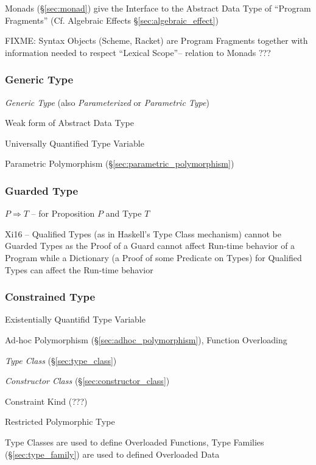 Monads (\S\ref{sec:monad}) give the Interface to the Abstract Data
Type of ``Program Fragments'' (\fist Cf. Algebraic Effects
\S\ref{sec:algebraic_effect})

FIXME: Syntax Objects (Scheme, Racket) are Program Fragments together
with information needed to respect ``Lexical Scope''-- relation to
Monads ???



\subsubsection{Generic Type}\label{sec:generic_type}

\emph{Generic Type} (also \emph{Parameterized} or \emph{Parametric Type})

Weak form of Abstract Data Type

Universally Quantified Type Variable

Parametric Polymorphism (\S\ref{sec:parametric_polymorphism})



\subsubsection{Guarded Type}\label{sec:guarded_type}

$P \Rightarrow T$ -- for Proposition $P$ and Type $T$

Xi16 -- Qualified Types (as in Haskell's Type Class mechanism) cannot
be Guarded Types as the Proof of a Guard cannot affect Run-time
behavior of a Program while a Dictionary (a Proof of some Predicate on
Types) for Qualified Types can affect the Run-time behavior



\subsubsection{Constrained Type}\label{sec:constrained_type}

Existentially Quantifid Type Variable

Ad-hoc Polymorphism (\S\ref{sec:adhoc_polymorphism}), Function
Overloading

\emph{Type Class} (\S\ref{sec:type_class})

\emph{Constructor Class} (\S\ref{sec:constructor_class})

Constraint Kind (???) %

Restricted Polymorphic Type %

Type Classes are used to define Overloaded Functions, Type Families
(\S\ref{sec:type_family}) are used to defined Overloaded Data

